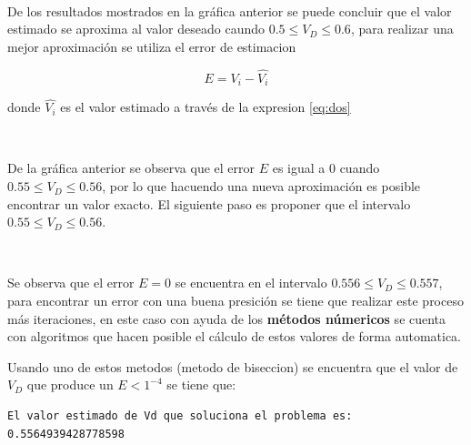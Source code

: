 \documentclass{article}
\begin{document}
    \begin{center}
    \end{center}
    { \hspace*{\fill} \\}
    
    De los resultados mostrados en la gráfica anterior se puede concluir que
el valor estimado se aproxima al valor deseado caundo
$0.5\leq V_{D} \leq 0.6$, para realizar una mejor aproximación se
utiliza el error de estimacion

\begin{equation}
E=V_{i}-\hat{V_{i}}
\end{equation}

donde $\hat{V_{i}}$ es el valor estimado a través de la expresion
\eqref{eq:dos}


    \begin{center}
    \end{center}
    { \hspace*{\fill} \\}
    
    De la gráfica anterior se observa que el error $E$ es igual a 0 cuando
$0.55 \leq V_{D} \leq 0.56$, por lo que hacuendo una nueva aproximación
es posible encontrar un valor exacto. El siguiente paso es proponer que
el intervalo $0.55 \leq V_{D} \leq 0.56$.


    \begin{center}
    \end{center}
    { \hspace*{\fill} \\}
    
    Se observa que el error $E=0$ se encuentra en el intervalo
$0.556 \leq V_{D} \leq 0.557$, para encontrar un error con una buena
presición se tiene que realizar este proceso más iteraciones, en este
caso con ayuda de los \textbf{métodos númericos} se cuenta con
algoritmos que hacen posible el cálculo de estos valores de forma
automatica.

Usando uno de estos metodos (metodo de biseccion) se encuentra que el
valor de $V_{D}$ que produce un $E<1^{-4}$ se tiene que:


    \begin{Verbatim}[commandchars=\\\{\}]
El valor estimado de Vd que soluciona el problema es: 0.5564939428778598
    \end{Verbatim}
\end{document}
